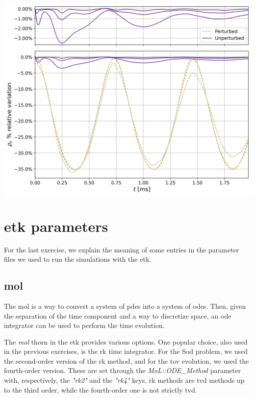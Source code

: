 \documentclass[11pt, a4paper]{article}
\begin{document}
\begin{center}
    \centering
    \includegraphics[width=1\linewidth]{images/rhoc_all_typecompare.png}
    \label{fig:ns_rhoc_all_compare}
\end{center}

\newpage

\section{\acrlong{etk} parameters}

For the last exercise, we explain the meaning of some entries in the parameter files we used to run the simulations with the \acrlong{etk}.

\subsection{\acrfull{mol}}

The \acrlong{mol} is a way to convert a system of \acrfull{pdes} into a system of \acrfull{odes}. Then, given the separation of the time component and a way to discretize space, an \acrshort{ode} integrator can be used to perform the time evolution.

The \textit{\acrshort{mol}} thorn in the \acrshort{etk} provides various options. One popular choice, also used in the previous exercises, is the \acrfull{rk} time integrator. For the Sod problem, we used the second-order version of the \acrshort{rk} method, and for the \acrshort{tov} evolution, we used the fourth-order version. These are set through the \textit{MoL::ODE\_Method} parameter with, respectively, the \textit{"rk2"} and the \textit{"rk4"} keys. \acrlong{rk} methods are \acrfull{tvd} methods up to the third order, while the fourth-order one is not strictly \acrshort{tvd}.
\end{document}
